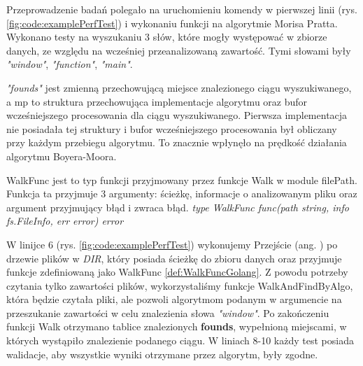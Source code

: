 Przeprowadzenie badań polegało na uruchomieniu komendy w pierwszej linii (rys. 
\ref{fig:code:examplePerfTest}) i wykonaniu funkcji na algorytmie Morisa Pratta. 
Wykonano testy na wyszukaniu 3 słów, które mogły występować w zbiorze danych,
ze względu na wcześniej przeanalizowaną zawartość. Tymi słowami były 
\textit{"window"}, \textit{"function"}, \textit{"main"}.


\textit{"founds"} jest zmienną przechowującą miejsce znalezionego 
ciągu wyszukiwanego, a mp to struktura przechowująca implementacje algorytmu oraz
bufor wcześniejszego procesowania dla ciągu wyszukiwanego. Pierwsza implementacja nie 
posiadała tej struktury i bufor wcześniejszego procesowania był obliczany przy każdym 
przebiegu algorytmu. To znacznie wpłynęło na prędkość działania algorytmu 
Boyera-Moora.

\begin{Definition}\label{def:WalkFuncGolang}
WalkFunc jest to typ funkcji przyjmowany przez funkcje Walk w module filePath.
Funkcja ta przyjmuje 3 argumenty: ścieżkę, informacje o analizowanym pliku oraz
argument przyjmujący błąd i zwraca błąd. \newline \newline
\textit{type WalkFunc func(path string, info fs.FileInfo, err error) error}
\end{Definition}

W linijce 6 (rys. \ref{fig:code:examplePerfTest}) wykonujemy Przejście (ang. 
) po drzewie plików w \textit{DIR}, który posiada ścieżkę do 
zbioru danych oraz przyjmuje funkcje zdefiniowaną jako WalkFunc 
\ref{def:WalkFuncGolang}. Z powodu potrzeby czytania tylko zawartości plików,
wykorzystaliśmy funkcje WalkAndFindByAlgo, która będzie czytała pliki, ale 
pozwoli algorytmom podanym w argumencie na przeszukanie zawartości w celu 
znalezienia słowa \textit{"window"}. Po zakończeniu funkcji Walk otrzymano 
tablice znalezionych \textbf{founds}, wypełnioną miejscami, w których wystąpiło znalezienie podanego
ciągu. W liniach 8-10 każdy test posiada walidacje, aby wszystkie wyniki 
otrzymane przez algorytm, były zgodne.

